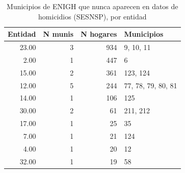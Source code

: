 \begin{table}[ht]
\centering
\caption{Municipios de ENIGH que nunca aparecen en datos de homicidios (SESNSP), por entidad} 
\label{tab:muni_M3_munis_nunca_en_sesnsp}
\begin{tabular}{rrrl}
  \toprule
Entidad & N munis & N hogares & Municipios \\ 
  \midrule
23.00 &   3 & 934 & 9, 10, 11 \\ 
  2.00 &   1 & 447 & 6 \\ 
  15.00 &   2 & 361 & 123, 124 \\ 
  12.00 &   5 & 244 & 77, 78, 79, 80, 81 \\ 
  14.00 &   1 & 106 & 125 \\ 
  30.00 &   2 &  61 & 211, 212 \\ 
  17.00 &   1 &  25 & 35 \\ 
  7.00 &   1 &  21 & 124 \\ 
  4.00 &   1 &  20 & 12 \\ 
  32.00 &   1 &  19 & 58 \\ 
   \bottomrule
\end{tabular}
\end{table}
